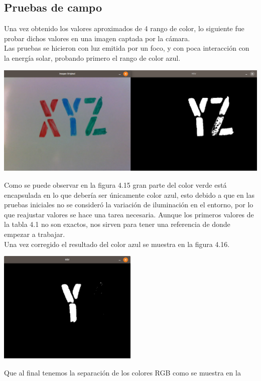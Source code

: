 \subsection{Pruebas de campo}
Una vez obtenido los valores aproximados de 4 rango de color, lo siguiente fue probar
dichos valores en una imagen captada por la cámara.\\
Las pruebas se hicieron con luz emitida por un foco, y con poca interacción con la
energía solar, probando primero el rango de color azul.
\begin{center}
	\includegraphics[width=0.90 \textwidth]{Contenido/Cuerpo/Capitulo4/Fig7.eps}
	\label{Fig7}
\end{center}
Como se puede observar en la figura 4.15 gran parte del color verde está encapsulada
en lo que debería ser únicamente color azul, esto debido a que en las pruebas iniciales
no se consideró la variación de iluminación en el entorno, por lo que reajustar
valores se hace una tarea necesaria. Aunque los primeros valores de la tabla 4.1
no son exactos, nos sirven para tener una referencia de donde empezar a trabajar.\\
Una vez corregido el resultado del color azul se muestra en la figura 4.16.
\begin{center}
	\includegraphics[width=0.5\textwidth]{Contenido/Cuerpo/Capitulo4/Fig9.eps}
	\label{Fig8}
\end{center}
Que al final tenemos la separación de los colores RGB como se muestra en la
